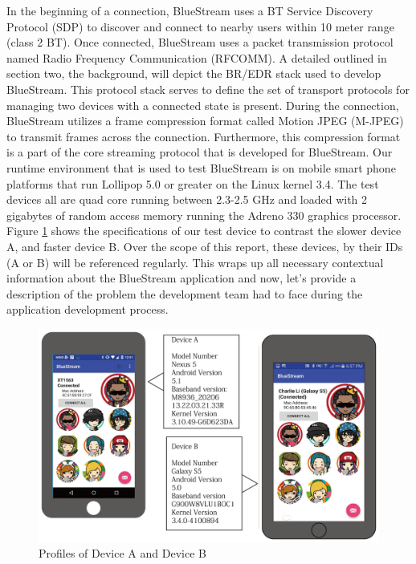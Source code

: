 \documentclass[a4paper,12pt]{article}
\begin{document}
In the beginning of a connection, BlueStream uses a BT Service Discovery Protocol (SDP) to discover and connect to nearby users within 10 meter range (class 2 BT). Once connected, BlueStream uses a packet transmission protocol named Radio Frequency Communication (RFCOMM). A detailed outlined in section two, the background, will depict the BR/EDR stack used to develop BlueStream. This protocol stack serves to define the set of transport protocols for managing two devices with a connected state is present. During the connection, BlueStream utilizes a frame compression format called Motion JPEG (M-JPEG) to transmit frames across the connection. Furthermore, this compression format is a part of the core streaming protocol that is developed for BlueStream. Our runtime environment that is used to test BlueStream is on mobile smart phone platforms that run Lollipop 5.0 or greater on the Linux kernel 3.4. The test devices all are quad core running between 2.3-2.5 GHz and loaded with 2 gigabytes of random access memory running the Adreno 330 graphics processor. Figure \ref{fig:DeviceProfiles} shows the specifications of our test device to contrast the slower device A, and faster device B. Over the scope of this report, these devices, by their IDs (A or B) will be referenced regularly. This wraps up all necessary contextual information about the BlueStream application and now, let's provide a description of the problem the development team had to face during the application development process.

\begin{figure}[h!]
\centering
\includegraphics[scale=.6]{Figures/Figure1.png}
\caption{Profiles of Device A and Device B}
\label{fig:DeviceProfiles}
\end{figure}
\end{document}
